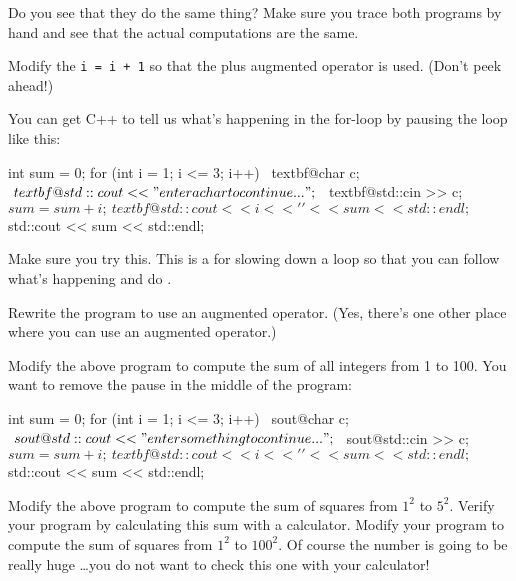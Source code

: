 Do you see that they do the same thing? Make sure you trace both
programs by hand and see that the actual computations are the same.

\begin{ex}
Modify the \texttt{i = i + 1} so that the plus
augmented operator is used. (Don't peek ahead!)
\end{ex}
\begin{ex}
You can get C++ to tell us what's
happening in the for-loop by pausing the loop like this:
\begin{console}[commandchars=\~\@\$]
int sum = 0;
for (int i = 1; i <= 3; i++)
{   
     ~textbf@char c;$
     ~textbf@std::cout << "enter a char to continue ...";$
     ~textbf@std::cin >> c;$

     sum = sum + i;
     ~textbf@std::cout << i << ' ' << sum << std::endl;$
}
std::cout << sum << std::endl;
\end{console}
\end{ex}

Make sure you try this. This is a  for
slowing down a loop so that you can follow what's
happening and do .

\begin{ex}
 Rewrite the program to use an augmented operator.
(Yes, there's one other place where you can use an
augmented operator.)
\end{ex}

\begin{ex}
 Modify the above program to compute the sum of all
integers from 1 to 100. You want to remove the pause in the middle of
the program:
\begin{console}[commandchars=\~\@\$]
int sum = 0;
for (int i = 1; i <= 3; i++)
{   
    ~sout@char c;$
    ~sout@std::cout << "enter something to continue ...";$
    ~sout@std::cin >> c;$
    
    sum = sum + i;
    ~textbf@std::cout << i << ' ' << sum << std::endl;$
}
std::cout << sum << std::endl;
\end{console}
\end{ex}

\begin{ex}
Modify the above program to compute the sum of squares from $1^{2}$ to $5^{2}$. Verify your program by calculating this sum with a calculator. Modify your program to compute the sum of squares from $1^{2}$ to $100^{2}$. Of course the number is going to be really huge \ldots you do not want to check this one with your calculator!
\end{ex}

